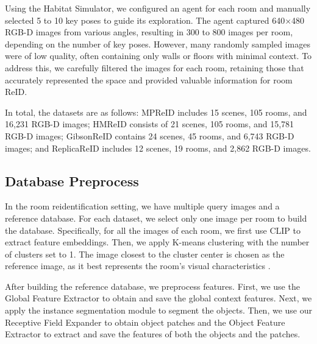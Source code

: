 Using the Habitat Simulator, we configured an agent for each room and manually selected 5 to 10 key poses to guide its exploration. The agent captured 640×480 RGB-D images from various angles, resulting in 300 to 800 images per room, depending on the number of key poses. However, many randomly sampled images were of low quality, often containing only walls or floors with minimal context. To address this, we carefully filtered the images for each room, retaining those that accurately represented the space and provided valuable information for room ReID.

In total, the datasets are as follows: MPReID includes 15 scenes, 105 rooms, and 16,231 RGB-D images; HMReID consists of 21 scenes, 105 rooms, and 15,781 RGB-D images; GibsonReID contains 24 scenes, 45 rooms, and 6,743 RGB-D images; and ReplicaReID includes 12 scenes, 19 rooms, and 2,862 RGB-D images.


\vspace{-4pt}
\subsection{Database Preprocess}
\vspace{-4pt}

In the room reidentification setting, we have multiple query images and a reference database. For each dataset, we select only one image per room to build the database. Specifically, for all the images of each room, we first use CLIP \cite{radford2021learningtransferablevisualmodels} to extract feature embeddings. Then, we apply K-means clustering with the number of clusters set to 1. The image closest to the cluster center is chosen as the reference image, as it best represents the room's visual characteristics \cite{tan2005introduction}.

After building the reference database, we preprocess features. First, we use the Global Feature Extractor to obtain and save the global context features. Next, we apply the instance segmentation module to segment the objects. Then, we use our Receptive Field Expander to obtain object patches and the Object Feature Extractor to extract and save the features of both the objects and the patches.


\vspace{-4pt}
